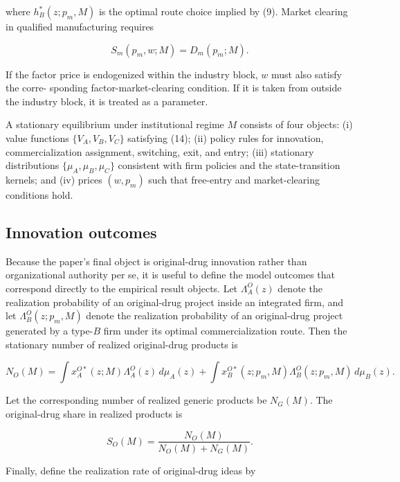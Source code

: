 \documentclass[12pt]{article}
\begin{document}
where $h_B^*(z;p_m,M)$ is the optimal route choice implied by (9). Market clearing in qualified
manufacturing requires

\begin{equation}
S_m(p_m,w;M)=D_m(p_m;M).
\end{equation}

If the factor price is endogenized within the industry block, $w$ must also satisfy the corre-
sponding factor-market-clearing condition. If it is taken from outside the industry block, it
is treated as a parameter.

A stationary equilibrium under institutional regime $M$ consists of four objects: 
(i) value functions $\{V_A,V_B,V_C\}$ satisfying (14); 
(ii) policy rules for innovation, commercialization assignment, switching, exit, and entry; 
(iii) stationary distributions $\{\mu_A,\mu_B,\mu_C\}$ consistent with firm policies and the state-transition kernels; 
and (iv) prices $(w,p_m)$ such that free-entry and market-clearing conditions hold.

\subsection{Innovation outcomes}

Because the paper's final object is original-drug innovation rather than organizational
authority per se, it is useful to define the model outcomes that correspond directly to the
empirical result objects. Let $\Lambda_A^O(z)$ denote the realization probability of an original-drug
project inside an integrated firm, and let $\Lambda_B^O(z;p_m,M)$ denote the realization probability
of an original-drug project generated by a type-$B$ firm under its optimal commercialization
route. Then the stationary number of realized original-drug products is

\begin{equation}
N_O(M)=\int x_A^{O*}(z;M)\Lambda_A^O(z)\,d\mu_A(z)+\int x_B^{O*}(z;p_m,M)\Lambda_B^O(z;p_m,M)\,d\mu_B(z).
\end{equation}

Let the corresponding number of realized generic products be $N_G(M)$. The original-drug
share in realized products is

\begin{equation}
S_O(M)=\frac{N_O(M)}{N_O(M)+N_G(M)}.
\end{equation}

Finally, define the realization rate of original-drug ideas by
\end{document}

